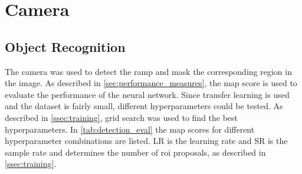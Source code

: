 \section{Camera}
\label{sec:eval_camera}
\subsection{Object Recognition}
The camera was used to detect the ramp and mask the corresponding region in the image.
As described in \cref{sec:performance_measures}, the \gls{map} score is used to evaluate the performance of the neural network.
Since transfer learning is used and the dataset is fairly small, different hyperparameters could be tested.
As described in \cref{ssec:training}, grid search was used to find the best hyperparameters.
In \cref{tab:detection_eval} the \gls{map} scores for different hyperparameter combinations are listed.
LR is the learning rate and SR is the sample rate and determines the number of \gls{roi} proposals, as described in \cref{ssec:training}.\par
